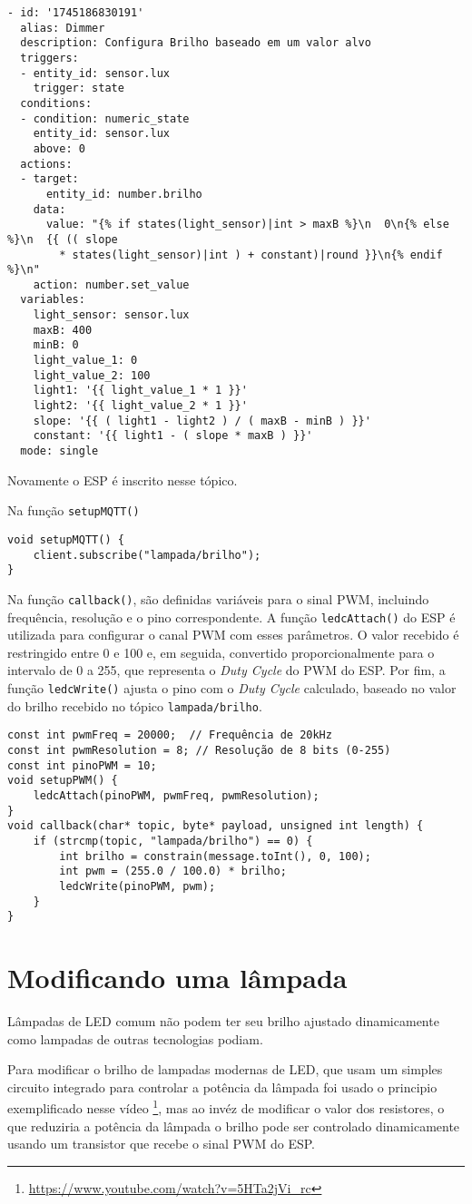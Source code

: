 \documentclass[]{abntex2}
\begin{document}
\begin{verbatim}
- id: '1745186830191'
  alias: Dimmer
  description: Configura Brilho baseado em um valor alvo
  triggers:
  - entity_id: sensor.lux
    trigger: state
  conditions:
  - condition: numeric_state
    entity_id: sensor.lux
    above: 0
  actions:
  - target:
      entity_id: number.brilho
    data:
      value: "{% if states(light_sensor)|int > maxB %}\n  0\n{% else %}\n  {{ (( slope
        * states(light_sensor)|int ) + constant)|round }}\n{% endif %}\n"
    action: number.set_value
  variables:
    light_sensor: sensor.lux
    maxB: 400
    minB: 0
    light_value_1: 0
    light_value_2: 100
    light1: '{{ light_value_1 * 1 }}'
    light2: '{{ light_value_2 * 1 }}'
    slope: '{{ ( light1 - light2 ) / ( maxB - minB ) }}'
    constant: '{{ light1 - ( slope * maxB ) }}'
  mode: single
\end{verbatim}

Novamente o ESP é inscrito nesse tópico.

Na função \texttt{setupMQTT()}
\begin{verbatim}
void setupMQTT() {
	client.subscribe("lampada/brilho");
}
\end{verbatim}

Na função \texttt{callback()}, são definidas variáveis para o sinal PWM,
incluindo frequência, resolução e o pino correspondente. A função
\texttt{ledcAttach()} do ESP é utilizada para configurar o canal PWM com esses
parâmetros. O valor recebido é restringido entre 0 e 100 e, em seguida,
convertido proporcionalmente para o intervalo de 0 a 255, que representa o
\textit{Duty Cycle} do PWM do ESP. Por fim, a função \texttt{ledcWrite()}
ajusta o pino com o \textit{Duty Cycle} calculado, baseado no valor do brilho
recebido no tópico \texttt{lampada/brilho}.

\begin{verbatim}
const int pwmFreq = 20000;  // Frequência de 20kHz
const int pwmResolution = 8; // Resolução de 8 bits (0-255)
const int pinoPWM = 10;
void setupPWM() {
	ledcAttach(pinoPWM, pwmFreq, pwmResolution);
}
void callback(char* topic, byte* payload, unsigned int length) {
	if (strcmp(topic, "lampada/brilho") == 0) {
		int brilho = constrain(message.toInt(), 0, 100);
		int pwm = (255.0 / 100.0) * brilho;
		ledcWrite(pinoPWM, pwm);
	}
}
\end{verbatim}

\section{Modificando uma lâmpada}
Lâmpadas de LED comum não podem ter seu brilho ajustado dinamicamente como
lampadas de outras tecnologias podiam.

Para modificar o brilho de lampadas modernas de LED, que usam um simples circuito integrado para controlar a potência da lâmpada foi usado o principio
exemplificado nesse vídeo \footnote{\url{https://www.youtube.com/watch?v=5HTa2jVi_rc}}, mas ao
invéz de modificar o valor dos resistores, o que reduziria a potência da lâmpada
o brilho pode ser controlado dinamicamente usando um transistor que recebe o sinal PWM
do ESP.
\end{document}

